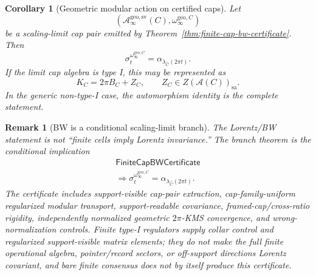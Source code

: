 \documentclass[11pt]{article}
\newtheorem{corollary}[theorem]{Corollary}
\newtheorem{remark}[theorem]{Remark}
\begin{document}
\begin{corollary}[Geometric modular action on certified caps]\label{cor:certified-cap-modular-action}
Let
\[
(\mathcal A_\infty^{\mathrm{geo,sv}}(C),\omega_\infty^{\mathrm{geo},C})
\]
be a scaling-limit cap pair emitted by Theorem~\ref{thm:finite-cap-bw-certificate}. Then
\[
\sigma_t^{\omega_\infty^{\mathrm{geo},C}}
=
\alpha_{\lambda_{\widehat C}(2\pi t)}.
\]
If the limit cap algebra is type I, this may be represented as
\[
K_C=2\pi B_C+Z_C,\qquad Z_C\in Z(\mathcal A(C))_{\mathrm{sa}}.
\]
In the generic non-type-I case, the automorphism identity is the complete statement.
\end{corollary}

\begin{remark}[BW is a conditional scaling-limit branch]\label{rem:bw-conditional-branch}
The Lorentz/BW statement is not ``finite cells imply Lorentz invariance.''  The branch theorem is
the conditional implication
\[
\begin{gathered}
\mathsf{FiniteCapBWCertificate}\\
\Longrightarrow
\sigma_t^{\omega_\infty^{\mathrm{geo},C}}
=
\alpha_{\lambda_{\widehat C}(2\pi t)} .
\end{gathered}
\]
The certificate includes support-visible cap-pair extraction, cap-family-uniform regularized
modular transport, support-readable covariance, framed-cap/cross-ratio rigidity, independently
normalized geometric \(2\pi\)-KMS convergence, and wrong-normalization controls. Finite type-I
regulators supply collar control and regularized support-visible matrix elements; they do not make
the full finite operational algebra, pointer/record sectors, or off-support directions Lorentz
covariant, and bare finite consensus does not by itself produce this certificate.
\end{remark}
\end{document}
